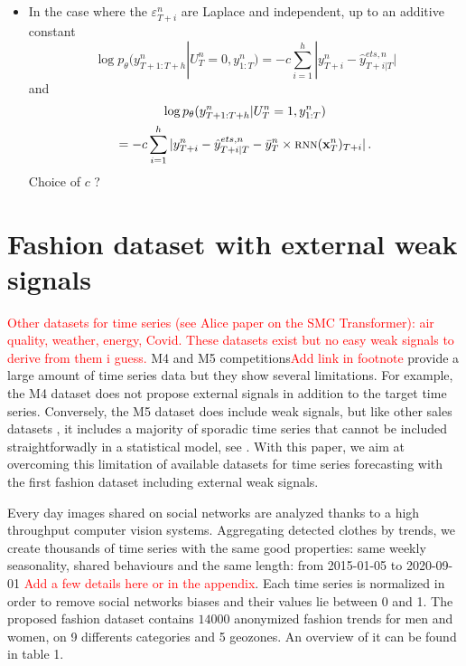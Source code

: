 \documentclass[letterpaper]{article} %
\newcommand{\ts}{y}
\newcommand{\etspred}{\hat{y}}
\newcommand{\meants}{\Bar{\ts}}
\newcommand{\rnnmodel}{\textsc{rnn}}
\newcommand{\concatinput}{x}
\newcommand{\fullconcatinput}{{ \bf \concatinput}}
\newcommand{\numberts}{14000}
\begin{document}
{\begin{itemize}
\begin{multline*}
 = -c\sum_{i=1}^{h}(\ts^n_{T+i}  - \etspred^{ets,n}_{T+i|T} - \meants^n_T\times \rnnmodel(\fullconcatinput^n_T)_{T+i})^2\,.
\end{multline*}
Choice of $c$ ?
\item In the case where the  $\varepsilon^n_{T+i}$ are Laplace and independent, up to an additive constant
$$
\log p_\theta(\ts^n_{T+1:T+h}|U_T^n=0,\ts^n_{1:T}) = -c\sum_{i=1}^{h}|\ts^n_{T+i}  - \etspred^{ets,n}_{T+i|T}|
$$
and
\begin{multline*}
\log p_\theta(\ts^n_{T+1:T+h}|U_T^n=1,\ts^n_{1:T})\\
 = -c\sum_{i=1}^{h}|\ts^n_{T+i}  - \etspred^{ets,n}_{T+i|T} - \meants^n_T\times \rnnmodel(\fullconcatinput^n_T)_{T+i}|\,.
\end{multline*}
Choice of $c$ ?
\end{itemize}}

\section{Fashion dataset with external weak signals}
\label{sec:dataset}
\textcolor{red}{Other datasets for time series (see Alice paper on the SMC Transformer): air quality, weather, energy, Covid. These datasets exist but no easy weak signals to derive from them i guess. }
M4 and M5 competitions\textcolor{red}{Add link in footnote} provide a large amount of time series data but they show several limitations. For example, the M4 dataset does not propose external signals in addition to the target time series. Conversely, the M5 dataset does include weak signals, but like other sales datasets \citep{C.Favorita}, it includes a majority of sporadic time series that cannot be included straightforwadly in a statistical model, see \citep{makridakis2020m5}. With this paper, we aim at overcoming this limitation of available datasets for time series forecasting with the first fashion dataset including external weak signals.

Every day images shared on social networks are analyzed thanks to a high throughput computer vision systems. Aggregating detected clothes by trends, we create thousands of time series with the same good properties: same weekly seasonality, shared behaviours and the same length: from 2015-01-05 to 2020-09-01 \textcolor{red}{Add a few details here or in the appendix}. Each time series is normalized in order to remove social networks biases and their values lie between 0 and 1. The proposed fashion dataset contains $\numberts$ anonymized fashion trends for men and women, on 9 differents categories and 5 geozones. An overview of it can be found in table 1.
\end{document}
